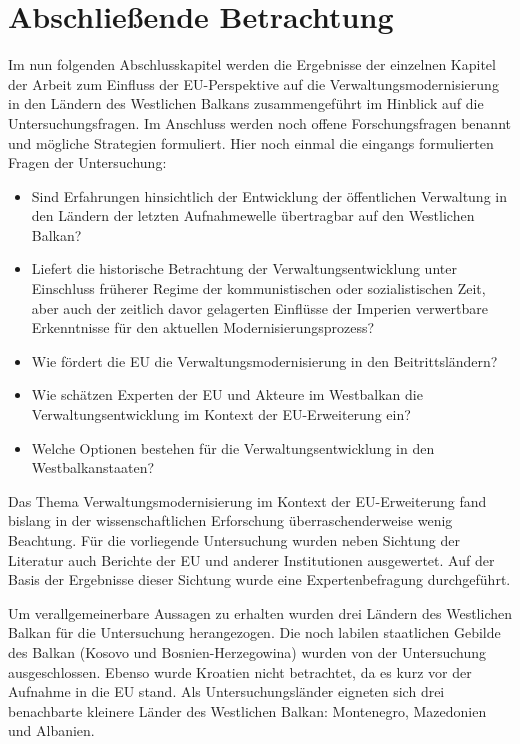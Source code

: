 \chapter{Abschließende Betrachtung}\label{chap:abschlBetrachtung}
Im nun folgenden Abschlusskapitel werden die Ergebnisse der einzelnen Kapitel der Arbeit zum Einfluss der EU-Perspektive auf die Verwaltungsmodernisierung in den Ländern des Westlichen Balkans zusammengeführt im Hinblick auf die Untersuchungsfragen. Im Anschluss werden noch offene Forschungsfragen benannt und mögliche Strategien formuliert. Hier noch einmal die eingangs formulierten Fragen der Untersuchung:
\begin{itemize} \itemsep1pt \parskip0pt 
\item Sind Erfahrungen hinsichtlich der Entwicklung der öffentlichen Verwaltung in den Ländern der letzten Aufnahmewelle übertragbar auf den Westlichen Balkan?
\item Liefert die historische Betrachtung der Verwaltungsentwicklung unter Einschluss früherer Regime der kommunistischen oder sozialistischen Zeit, aber auch der zeitlich davor gelagerten Einflüsse der Imperien verwertbare Erkenntnisse für den aktuellen Modernisierungsprozess?
\item Wie fördert die EU die Verwaltungsmodernisierung in den Beitrittsländern?
\item Wie schätzen Experten der EU und Akteure im Westbalkan die Verwaltungsentwicklung im Kontext der EU-Erweiterung ein?
\item Welche Optionen bestehen für die Verwaltungsentwicklung in den Westbalkanstaaten?
\end{itemize}
Das Thema Verwaltungsmodernisierung im Kontext der EU-Erweiterung fand bislang in der wissenschaftlichen Erforschung überraschenderweise wenig Beachtung. Für die vorliegende Untersuchung wurden neben Sichtung der Literatur auch Berichte der EU und anderer Institutionen ausgewertet. Auf der Basis der Ergebnisse dieser Sichtung wurde eine Expertenbefragung durchgeführt.\par
Um verallgemeinerbare Aussagen zu erhalten wurden drei Ländern des Westlichen Balkan für die Untersuchung herangezogen. Die noch labilen staatlichen Gebilde des Balkan (Kosovo und Bosnien-Herzegowina) wurden von der Untersuchung ausgeschlossen. Ebenso wurde Kroatien nicht betrachtet, da es kurz vor der Aufnahme in die EU stand. Als Untersuchungsländer eigneten sich drei benachbarte kleinere Länder des Westlichen Balkan: Montenegro, Mazedonien und Albanien.\par
